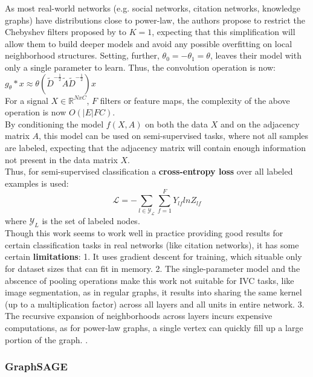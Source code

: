 As most real-world networks (e.g. social networks, citation networks, knowledge
graphs) have distributions close to power-law, the authors propose to restrict
the Chebyshev filters proposed by \cite{mddef} to $K=1$, expecting that this
simplification will allow them to build deeper models and avoid any possible
overfitting on local neighborhood structures. Setting, further, $\theta_0 =
-\theta_1 = \theta$, leaves their model with only a single parameter to learn.
Thus, the convolution operation is now:\\
$g_\theta * x \approx \theta (\widetilde{D}^{-\frac{1}{2}}\widetilde{A}\widetilde{D}^{-\frac{1}{2}})
x$\\
For a signal $X \in \mathbb{R}^{NxC}$, $F$ filters or feature maps, the
complexity of the above operation is now $O(|E|FC)$.\\
By conditioning the model $f(X,A)$ on both the data $X$ and on the adjacency
matrix $A$, this model can be used on semi-supervised tasks, where not all
samples are labeled, expecting that the adjacency matrix will contain enough
information not present in the data matrix $X$.\\
Thus, for semi-supervised classification a \textbf{cross-entropy loss} over all labeled
examples is used:
\begin{equation}
\mathcal{L} = - \sum_{l\in \mathcal{Y_L}} \sum_{f=1}^{F} Y_{lf}lnZ_{lf} 
\end{equation}
where $\mathcal{Y}_L$ is the set of labeled nodes.\\
Though this work seems to work well in practice providing good results for
certain classification tasks in real networks (like citation networks), it has
some certain \textbf{limitations}: 1. It uses gradient descent for training, which
situable only for dataset sizes that can fit in memory. 2. The single-parameter
model and the abscence of pooling operations make this work not suitable for IVC
tasks, like image segmentation, as in regular graphs, it results into sharing
the same kernel (up to a multiplication factor) across all layers and all units 
in entire network.\cite{blogpost} 3. The recursive expansion of neighborhoods
across layers incurs expensive computations, as for power-law graphs, a single
vertex can quickly fill up a large portion of the graph. \cite{fastgcn}. 
\subsubsection*{GraphSAGE}

